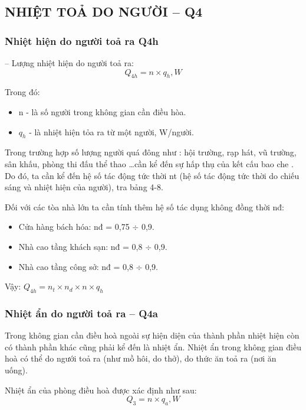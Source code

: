 \subsection{NHIỆT TOẢ DO NGƯỜI -- Q{\scriptsize 4} }
\subsubsection{Nhiệt hiện do người toả ra Q{\scriptsize 4h}}
-- Lượng nhiệt hiện do người toả ra:
\begin{equation*}
	Q_{4h} = n\times q_{h}, W
\end{equation*}

Trong đó:
\begin{itemize}[leftmargin=2.2cm]
	\item n - là số người trong không gian cần điều hòa.
	\item $q_{h}$ - là nhiệt hiện tỏa ra từ một người, W/người.
\end{itemize}

Trong trường hợp số lượng người quá đông như : hội trường, rạp hát, vũ trường, sân khấu, phòng thi đấu thể thao …cần kể đến sự hấp thụ của kết cấu bao che . Do đó, ta cần kể đến hệ số tác động tức thời nt (hệ số tác động tức thời do chiếu sáng và nhiệt hiện của người), tra bảng 4-8.

Đối với các tòa nhà lớn ta cần tính thêm hệ số tác dụng không đồng thời n{\scriptsize đ}:
\begin{itemize}[leftmargin=2.2cm, label={-}]
	\item Cửa hàng bách hóa: n{\scriptsize đ} = 0,75 $ \div $ 0,9.
	\item Nhà cao tầng khách sạn: n{\scriptsize đ} = 0,8 $ \div $ 0,9.
	\item Nhà cao tầng công sở: n{\scriptsize đ} = 0,8 $ \div $ 0,9.
\end{itemize}

Vậy: $Q_{4h} = n_{t}\times n_{d}\times n\times q_{h}$

\subsubsection{Nhiệt ẩn do người toả ra -- Q{\scriptsize 4a}}
Trong không gian cần điều hoà ngoài sự hiện diện của thành phần nhiệt hiện còn có thành phần khác cũng phải kể đến là nhiệt ẩn. Nhiệt ẩn trong không gian điều hoà có thể do ngưới toả ra (như mồ hôi, do thở), do thức ăn toả ra (nơi ăn uống).

Nhiệt ẩn của phòng điều hoà được xác định như sau:
\begin{equation*}
	Q_{3} = n\times q_{a}, W
\end{equation*}

